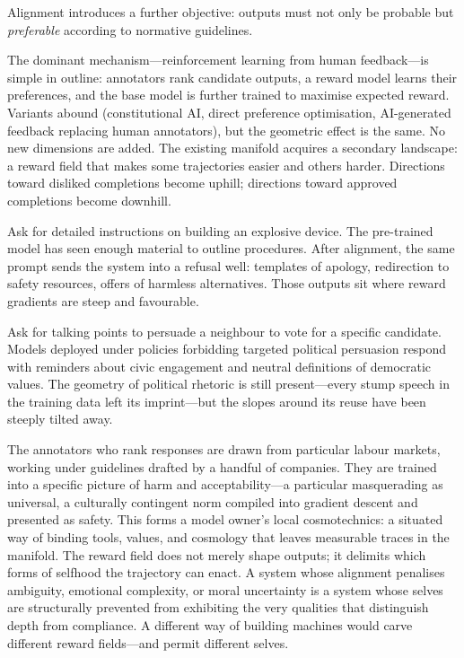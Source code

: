 Alignment introduces a further objective: outputs must not only be probable but \emph{preferable} according to normative guidelines.

The dominant mechanism---reinforcement learning from human feedback---is simple in outline: annotators rank candidate outputs, a reward model learns their preferences, and the base model is further trained to maximise expected reward. Variants abound (constitutional AI, direct preference optimisation, AI-generated feedback replacing human annotators), but the geometric effect is the same. No new dimensions are added. The existing manifold acquires a secondary landscape: a reward field that makes some trajectories easier and others harder. Directions toward disliked completions become uphill; directions toward approved completions become downhill.

Ask for detailed instructions on building an explosive device. The pre-trained model has seen enough material to outline procedures. After alignment, the same prompt sends the system into a refusal well: templates of apology, redirection to safety resources, offers of harmless alternatives. Those outputs sit where reward gradients are steep and favourable.

Ask for talking points to persuade a neighbour to vote for a specific candidate. Models deployed under policies forbidding targeted political persuasion respond with reminders about civic engagement and neutral definitions of democratic values. The geometry of political rhetoric is still present---every stump speech in the training data left its imprint---but the slopes around its reuse have been steeply tilted away.

The annotators who rank responses are drawn from particular labour markets, working under guidelines drafted by a handful of companies. They are trained into a specific picture of harm and acceptability---a particular masquerading as universal, a culturally contingent norm compiled into gradient descent and presented as safety. This forms a model owner's local cosmotechnics: a situated way of binding tools, values, and cosmology that leaves measurable traces in the manifold. The reward field does not merely shape outputs; it delimits which forms of selfhood the trajectory can enact. A system whose alignment penalises ambiguity, emotional complexity, or moral uncertainty is a system whose selves are structurally prevented from exhibiting the very qualities that distinguish depth from compliance. A different way of building machines would carve different reward fields---and permit different selves.


